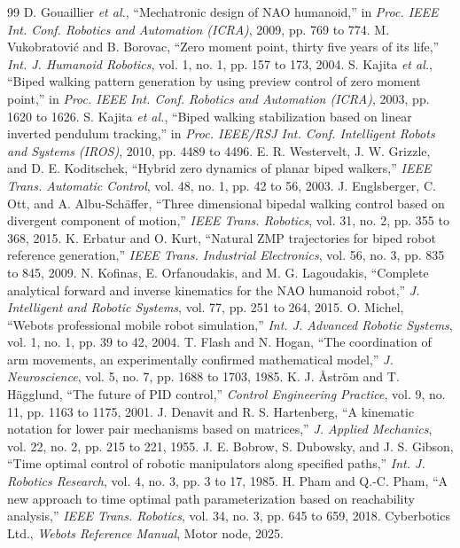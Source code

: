 \documentclass[10pt,journal]{IEEEtran}
\begin{document}
\begin{thebibliography}{99}
 D. Gouaillier \textit{et al.}, ``Mechatronic design of NAO humanoid,'' in \textit{Proc. IEEE Int. Conf. Robotics and Automation (ICRA)}, 2009, pp. 769 to 774.
 M. Vukobratovi\'c and B. Borovac, ``Zero moment point, thirty five years of its life,'' \textit{Int. J. Humanoid Robotics}, vol. 1, no. 1, pp. 157 to 173, 2004.
 S. Kajita \textit{et al.}, ``Biped walking pattern generation by using preview control of zero moment point,'' in \textit{Proc. IEEE Int. Conf. Robotics and Automation (ICRA)}, 2003, pp. 1620 to 1626.
 S. Kajita \textit{et al.}, ``Biped walking stabilization based on linear inverted pendulum tracking,'' in \textit{Proc. IEEE/RSJ Int. Conf. Intelligent Robots and Systems (IROS)}, 2010, pp. 4489 to 4496.
 E. R. Westervelt, J. W. Grizzle, and D. E. Koditschek, ``Hybrid zero dynamics of planar biped walkers,'' \textit{IEEE Trans. Automatic Control}, vol. 48, no. 1, pp. 42 to 56, 2003.
 J. Englsberger, C. Ott, and A. Albu-Sch\"affer, ``Three dimensional bipedal walking control based on divergent component of motion,'' \textit{IEEE Trans. Robotics}, vol. 31, no. 2, pp. 355 to 368, 2015.
 K. Erbatur and O. Kurt, ``Natural ZMP trajectories for biped robot reference generation,'' \textit{IEEE Trans. Industrial Electronics}, vol. 56, no. 3, pp. 835 to 845, 2009.
 N. Kofinas, E. Orfanoudakis, and M. G. Lagoudakis, ``Complete analytical forward and inverse kinematics for the NAO humanoid robot,'' \textit{J. Intelligent and Robotic Systems}, vol. 77, pp. 251 to 264, 2015.
 O. Michel, ``Webots professional mobile robot simulation,'' \textit{Int. J. Advanced Robotic Systems}, vol. 1, no. 1, pp. 39 to 42, 2004.
 T. Flash and N. Hogan, ``The coordination of arm movements, an experimentally confirmed mathematical model,'' \textit{J. Neuroscience}, vol. 5, no. 7, pp. 1688 to 1703, 1985.
 K. J. {\AA}str\"om and T. H{\"a}gglund, ``The future of PID control,'' \textit{Control Engineering Practice}, vol. 9, no. 11, pp. 1163 to 1175, 2001.
 J. Denavit and R. S. Hartenberg, ``A kinematic notation for lower pair mechanisms based on matrices,'' \textit{J. Applied Mechanics}, vol. 22, no. 2, pp. 215 to 221, 1955.
 J. E. Bobrow, S. Dubowsky, and J. S. Gibson, ``Time optimal control of robotic manipulators along specified paths,'' \textit{Int. J. Robotics Research}, vol. 4, no. 3, pp. 3 to 17, 1985.
 H. Pham and Q.-C. Pham, ``A new approach to time optimal path parameterization based on reachability analysis,'' \textit{IEEE Trans. Robotics}, vol. 34, no. 3, pp. 645 to 659, 2018.
 Cyberbotics Ltd., \textit{Webots Reference Manual}, Motor node, 2025.
\end{thebibliography}
\end{document}
